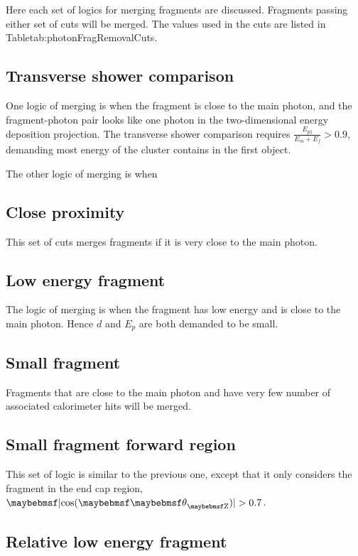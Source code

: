 Here each set of logics for merging fragments are discussed. Fragments passing either set of cuts will be merged. The values used in the cuts are listed in Table{tab:photonFragRemovalCuts}.

\subsection{Transverse shower comparison}

One logic of merging is when the fragment is close to the main photon, and the fragment-photon pair looks like one photon in the two-dimensional energy deposition projection. The transverse shower comparison requires $\frac{E_{p1}}{E_m + E_f} > 0.9 $, demanding  most energy of the cluster contains in the first \ShowerPeak object.

The other logic of merging is when 

\subsection{Close proximity}

This set of cuts merges fragments if it is very close to the main photon.

\subsection{Low energy fragment}

The logic of merging  is when the fragment has low energy and is close to the main photon.  Hence $d$ and $E_p$ are both demanded to be small.

\subsection{Small fragment}

Fragments that are close to the main photon and have very few number of associated calorimeter hits will be merged. 

\subsection{Small fragment forward region}

This set of logic is similar to the previous one, except that it only considers the fragment in the end cap region,  $\absCosTheta > 0.7$.

\subsection{Relative low energy fragment}

